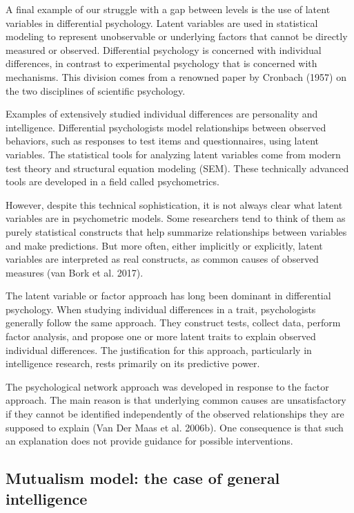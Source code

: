 \documentclass[
  a4paper,
  DIV=11,
  numbers=noendperiod]{scrreprt}
\begin{document}
A final example of our struggle with a gap between levels is the use of
latent variables in differential psychology. Latent variables are used
in statistical modeling to represent unobservable or underlying factors
that cannot be directly measured or observed. Differential psychology is
concerned with individual differences, in contrast to experimental
psychology that is concerned with mechanisms. This division comes from a
renowned paper by Cronbach (1957) on the two disciplines of scientific
psychology.

Examples of extensively studied individual differences are personality
and intelligence. Differential psychologists model relationships between
observed behaviors, such as responses to test items and questionnaires,
using latent variables. The statistical tools for analyzing latent
variables come from modern test theory and structural equation modeling
(SEM). These technically advanced tools are developed in a field called
psychometrics.

However, despite this technical sophistication, it is not always clear
what latent variables are in psychometric models. Some researchers tend
to think of them as purely statistical constructs that help summarize
relationships between variables and make predictions. But more often,
either implicitly or explicitly, latent variables are interpreted as
real constructs, as common causes of observed measures (van Bork et al.
2017).

The latent variable or factor approach has long been dominant in
differential psychology. When studying individual differences in a
trait, psychologists generally follow the same approach. They construct
tests, collect data, perform factor analysis, and propose one or more
latent traits to explain observed individual differences. The
justification for this approach, particularly in intelligence research,
rests primarily on its predictive power.

The psychological network approach was developed in response to the
factor approach. The main reason is that underlying common causes are
unsatisfactory if they cannot be identified independently of the
observed relationships they are supposed to explain (Van Der Maas et al.
2006b). One consequence is that such an explanation does not provide
guidance for possible interventions.

\hypertarget{sec-Mutualism-model-the-case-of-general-intelligence}{%
\subsection{Mutualism model: the case of general
intelligence}\label{sec-Mutualism-model-the-case-of-general-intelligence}}
\end{document}
